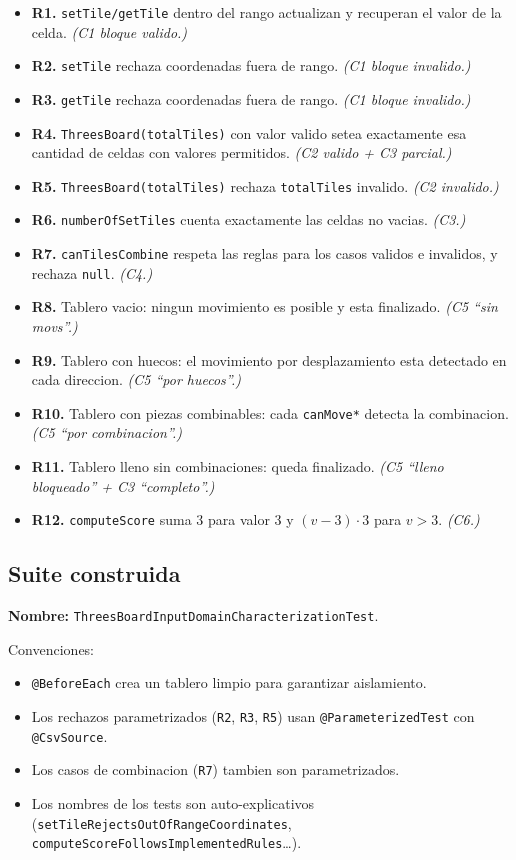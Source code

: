 \documentclass[12pt,a4paper]{article}
\begin{document}
\begin{itemize}
  \item \textbf{R1.} \texttt{setTile/getTile} dentro del rango actualizan y recuperan el
  valor de la celda. \emph{(C1 bloque valido.)}
  \item \textbf{R2.} \texttt{setTile} rechaza coordenadas fuera de rango. \emph{(C1 bloque
  invalido.)}
  \item \textbf{R3.} \texttt{getTile} rechaza coordenadas fuera de rango. \emph{(C1 bloque
  invalido.)}
  \item \textbf{R4.} \texttt{ThreesBoard(totalTiles)} con valor valido setea exactamente esa
  cantidad de celdas con valores permitidos. \emph{(C2 valido + C3 parcial.)}
  \item \textbf{R5.} \texttt{ThreesBoard(totalTiles)} rechaza \texttt{totalTiles} invalido.
  \emph{(C2 invalido.)}
  \item \textbf{R6.} \texttt{numberOfSetTiles} cuenta exactamente las celdas no vacias.
  \emph{(C3.)}
  \item \textbf{R7.} \texttt{canTilesCombine} respeta las reglas para los casos validos e
  invalidos, y rechaza \texttt{null}. \emph{(C4.)}
  \item \textbf{R8.} Tablero vacio: ningun movimiento es posible y esta finalizado.
  \emph{(C5 ``sin movs''.)}
  \item \textbf{R9.} Tablero con huecos: el movimiento por desplazamiento esta detectado en
  cada direccion. \emph{(C5 ``por huecos''.)}
  \item \textbf{R10.} Tablero con piezas combinables: cada \texttt{canMove*} detecta la
  combinacion. \emph{(C5 ``por combinacion''.)}
  \item \textbf{R11.} Tablero lleno sin combinaciones: queda finalizado. \emph{(C5 ``lleno
  bloqueado'' + C3 ``completo''.)}
  \item \textbf{R12.} \texttt{computeScore} suma $3$ para valor $3$ y $(v-3)\cdot 3$ para
  $v > 3$. \emph{(C6.)}
\end{itemize}

\subsection{Suite construida}

\textbf{Nombre:} \texttt{ThreesBoardInputDomainCharacterizationTest}.

Convenciones:

\begin{itemize}
  \item \texttt{@BeforeEach} crea un tablero limpio para garantizar aislamiento.
  \item Los rechazos parametrizados (\texttt{R2}, \texttt{R3}, \texttt{R5}) usan
  \texttt{@ParameterizedTest} con \texttt{@CsvSource}.
  \item Los casos de combinacion (\texttt{R7}) tambien son parametrizados.
  \item Los nombres de los tests son auto-explicativos
  (\texttt{setTileRejectsOutOfRangeCoordinates}, \texttt{computeScoreFollowsImplementedRules}\ldots).
\end{itemize}
\end{document}
